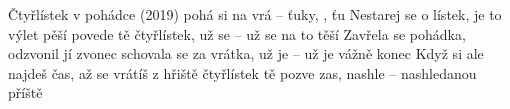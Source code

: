 \begin{TEXT}{Čtyřlístek v pohádce (2019)}
\SLOKA {} pohá  
 si na vrá  -- ťuky, , ťu
\SLOKA Nestarej se o lístek, je to výlet pěší
povede tě čtyřlístek, už se -- už se na to těší
\SLOKA Zavřela se pohádka, odzvonil jí zvonec
schovala se za vrátka, už je -- už je vážně konec
\SLOKA Když si ale najdeš čas, až se vrátíš z hřiště
čtyřlístek tě pozve zas, nashle -- nashledanou příště
\end{TEXT}